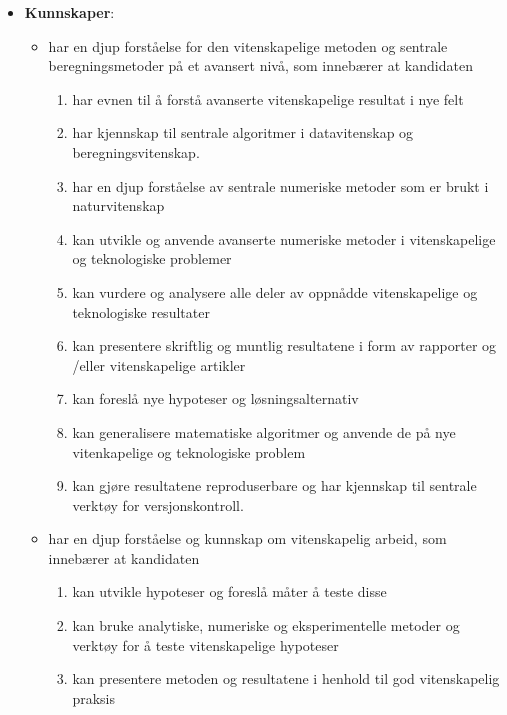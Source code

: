\documentclass{article}
\begin{document}
\begin{itemize}
  \item \textbf{Kunnskaper}:
    \begin{itemize}
      \item har en djup forståelse for den vitenskapelige metoden og sentrale beregningsmetoder på et avansert nivå, som innebærer at kandidaten
        \begin{enumerate}
          \item har evnen til å forstå avanserte vitenskapelige resultat i nye felt
          \item har kjennskap til sentrale algoritmer i datavitenskap og beregningsvitenskap.
          \item har en djup forståelse av sentrale numeriske metoder som er brukt i naturvitenskap
          \item kan utvikle og anvende avanserte numeriske metoder i vitenskapelige og teknologiske problemer
          \item kan vurdere og analysere alle deler av oppnådde vitenskapelige og teknologiske resultater
          \item kan presentere skriftlig og muntlig resultatene i form av rapporter og /eller vitenskapelige artikler
          \item kan foreslå nye hypoteser og løsningsalternativ
          \item kan generalisere matematiske algoritmer og anvende de på nye vitenkapelige og teknologiske problem
          \item kan gjøre resultatene reproduserbare  og har kjennskap til sentrale verktøy for versjonskontroll.
        \end{enumerate}

        \noindent
      \item har en djup forståelse og kunnskap om vitenskapelig arbeid, som innebærer at kandidaten
        \begin{enumerate}
          \item kan utvikle hypoteser og foreslå måter å teste disse
          \item kan bruke analytiske, numeriske og eksperimentelle metoder og verktøy for å teste vitenskapelige hypoteser
          \item kan presentere metoden og resultatene i henhold til god vitenskapelig praksis
        \end{enumerate}

        \noindent
    \end{itemize}


\end{itemize}
\end{document}
